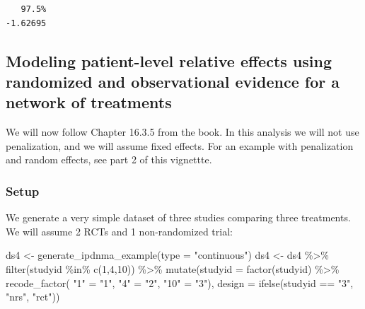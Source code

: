 \documentclass[
  letterpaper,
  DIV=11,
  numbers=noendperiod]{scrreprt}
\newenvironment{Shaded}{\begin{snugshade}}{\end{snugshade}}
\newcommand{\AttributeTok}[1]{\textcolor[rgb]{0.40,0.45,0.13}{#1}}
\newcommand{\DecValTok}[1]{\textcolor[rgb]{0.68,0.00,0.00}{#1}}
\newcommand{\FunctionTok}[1]{\textcolor[rgb]{0.28,0.35,0.67}{#1}}
\newcommand{\NormalTok}[1]{\textcolor[rgb]{0.00,0.23,0.31}{#1}}
\newcommand{\OtherTok}[1]{\textcolor[rgb]{0.00,0.23,0.31}{#1}}
\newcommand{\SpecialCharTok}[1]{\textcolor[rgb]{0.37,0.37,0.37}{#1}}
\newcommand{\StringTok}[1]{\textcolor[rgb]{0.13,0.47,0.30}{#1}}
\begin{document}
\begin{verbatim}
   97.5% 
-1.62695 
\end{verbatim}

\hypertarget{modeling-patient-level-relative-effects-using-randomized-and-observational-evidence-for-a-network-of-treatments}{%
\subsection{Modeling patient-level relative effects using randomized and
observational evidence for a network of
treatments}\label{modeling-patient-level-relative-effects-using-randomized-and-observational-evidence-for-a-network-of-treatments}}

We will now follow Chapter 16.3.5 from the book. In this analysis we
will not use penalization, and we will assume fixed effects. For an
example with penalization and random effects, see part 2 of this
vignettte.

\hypertarget{setup-3}{%
\subsubsection{Setup}\label{setup-3}}

We generate a very simple dataset of three studies comparing three
treatments. We will assume 2 RCTs and 1 non-randomized trial:

\begin{Shaded}
\begin{Highlighting}[]
\NormalTok{ds4 }\OtherTok{\textless{}{-}} \FunctionTok{generate\_ipdnma\_example}\NormalTok{(}\AttributeTok{type =} \StringTok{"continuous"}\NormalTok{)}
\NormalTok{ds4 }\OtherTok{\textless{}{-}}\NormalTok{ ds4 }\SpecialCharTok{\%\textgreater{}\%} \FunctionTok{filter}\NormalTok{(studyid }\SpecialCharTok{\%in\%} \FunctionTok{c}\NormalTok{(}\DecValTok{1}\NormalTok{,}\DecValTok{4}\NormalTok{,}\DecValTok{10}\NormalTok{)) }\SpecialCharTok{\%\textgreater{}\%}
  \FunctionTok{mutate}\NormalTok{(}\AttributeTok{studyid =} \FunctionTok{factor}\NormalTok{(studyid) }\SpecialCharTok{\%\textgreater{}\%}
           \FunctionTok{recode\_factor}\NormalTok{(}
             \StringTok{"1"} \OtherTok{=} \StringTok{"1"}\NormalTok{,}
             \StringTok{"4"} \OtherTok{=} \StringTok{"2"}\NormalTok{,}
             \StringTok{"10"} \OtherTok{=} \StringTok{"3"}\NormalTok{),}
         \AttributeTok{design =} \FunctionTok{ifelse}\NormalTok{(studyid }\SpecialCharTok{==} \StringTok{"3"}\NormalTok{, }\StringTok{"nrs"}\NormalTok{, }\StringTok{"rct"}\NormalTok{))}
\end{Highlighting}
\end{Shaded}
\end{document}
